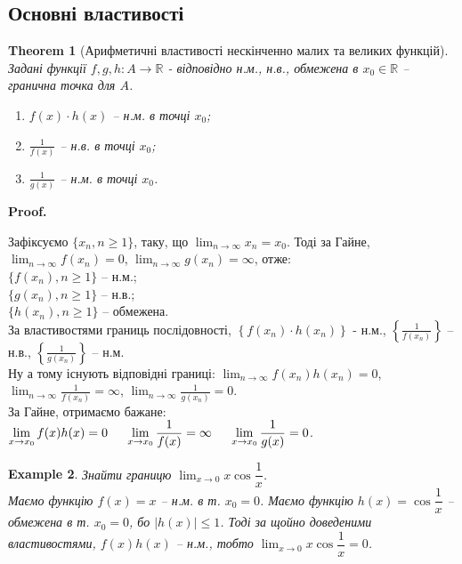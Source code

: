 \documentclass[a4paper, 14pt]{article}
\makeatletter
\def\qed{$\blacksquare$}
\theoremstyle{theoremdd}
\newtheorem{theorem}{Theorem}[subsection]
\theoremstyle{theoremdd}
\theoremstyle{theoremdd}
\theoremstyle{theoremdd}
\newtheorem{example}[theorem]{Example}
\theoremstyle{theoremdd}
\theoremstyle{theoremdd}
\theoremstyle{theoremdd}
\theoremstyle{theoremdd}
\renewenvironment{proof}[1][Proof.\\]{\par
\pushQED{\hfill \qed}%
\normalfont \topsep6\p@\@plus6\p@\relax
\trivlist
\item\relax
{\bfseries
#1\@addpunct{.}}\hspace\labelsep\ignorespaces
}{%
\popQED\endtrivlist\@endpefalse
}
\makeatother
\begin{document}
	\subsection{Основні властивості}
	\begin{theorem}[Арифметичні властивості нескінченно малих та великих функцій]
	Задані функції $f,g,h \colon A \to \mathbb{R}$ - відповідно н.м., н.в., обмежена в $x_0 \in \mathbb{R}$ -- гранична точка для $A$.
	\begin{enumerate}[nosep,wide=0pt,label={\arabic*)}]
	\item $f(x) \cdot h(x)$ -- н.м. в точці $x_0$;
	\item $\displaystyle \frac{1}{f(x)}$ -- н.в. в точці $x_0$;
	\item $\displaystyle \frac{1}{g(x)}$ -- н.м. в точці $x_0$.
	\end{enumerate}
	\end{theorem}
	
	\begin{proof}
	Зафіксуємо $\{x_n, n \geq 1\}$, таку, що $\displaystyle \lim_{n \to \infty} x_n = x_0$. Тоді за Гайне, $\displaystyle \lim_{n \to \infty} f(x_n) = 0$, $\displaystyle \lim_{n \to \infty} g(x_n) = \infty$, отже:\\
	$\{f(x_n), n \geq 1\}$ -- н.м.;\\
	$\{g(x_n), n \geq 1\}$ -- н.в.;\\
	$\{h(x_n), n \geq 1\}$ -- обмежена.\\
	За властивостями границь послідовності, $\left\{f(x_n) \cdot h(x_n) \right\}$ - н.м., $\left\{ \displaystyle \frac{1}{f(x_n)} \right\}$ -- н.в., $\left\{ \displaystyle \frac{1}{g(x_n)} \right\}$ -- н.м.\\
	Ну а тому існують відповідні границі: $\displaystyle \lim_{n \to \infty} f(x_n) h(x_n) = 0$, $\displaystyle \lim_{n \to \infty} \frac{1}{f(x_n)} = \infty$, $\displaystyle \lim_{n \to \infty} \frac{1}{g(x_n)} = 0$.\\
	За Гайне, отримаємо бажане: $\displaystyle\lim_{x \to x_0} f(x)h(x) = 0 \hspace{0.5cm} \displaystyle\lim_{x \to x_0} \dfrac{1}{f(x)} = \infty \hspace{0.5cm} \displaystyle\lim_{x \to x_0} \dfrac{1}{g(x)} = 0$.
	\end{proof}
	
	\begin{example}
	Знайти границю $\displaystyle\lim_{x \to 0} x \cos \dfrac{1}{x}$.\\
	Маємо функцію $f(x) = x$ -- н.м. в т. $x_0 = 0$. Маємо функцію $h(x) = \cos \dfrac{1}{x}$ -- обмежена в т. $x_0 = 0$, бо $|h(x)| \leq 1$. Тоді за щойно доведеними властивостями, $f(x)h(x)$ -- н.м., тобто $\displaystyle\lim_{x \to 0} x \cos \dfrac{1}{x} = 0$.
	\end{example}
	
\end{document}
